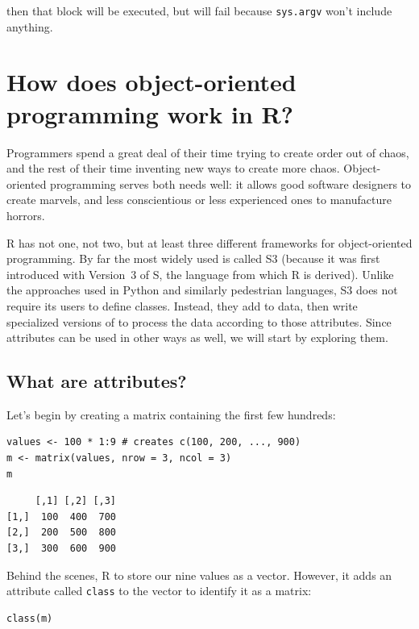\noindent
then that block will be executed,
but will fail because \texttt{sys.argv} won't include anything.

\section{How does object-oriented programming work in R?}\label{advanced-oop}

Programmers spend a great deal of their time trying to create order out of chaos,
and the rest of their time inventing new ways to create more chaos.
Object-oriented programming serves both needs well:
it allows good software designers to create marvels,
and less conscientious or less experienced ones to manufacture horrors.

R has not one,
not two,
but at least three different frameworks for object-oriented programming.
By far the most widely used is called S3
(because it was first introduced with Version~3 of S,
the language from which R is derived).
Unlike the approaches used in Python and similarly pedestrian languages,
S3 does not require its users to define classes.
Instead,
they add  to data,
then write specialized versions of 
to process the data according to those attributes.
Since attributes can be used in other ways as well,
we will start by exploring them.

\subsection*{What are attributes?}

Let's begin by creating a matrix containing the first few hundreds:

\begin{lstlisting}
values <- 100 * 1:9 # creates c(100, 200, ..., 900)
m <- matrix(values, nrow = 3, ncol = 3)
m
\end{lstlisting}

\begin{lstlisting}
     [,1] [,2] [,3]
[1,]  100  400  700
[2,]  200  500  800
[3,]  300  600  900
\end{lstlisting}

Behind the scenes,
R to store our nine values as a vector.
However,
it adds an attribute called \texttt{class} to the vector to identify it as a matrix:

\begin{lstlisting}
class(m)
\end{lstlisting}

